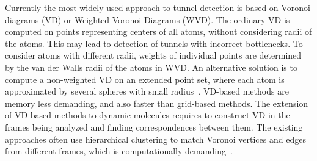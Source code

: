 \documentclass{svmult}
\begin{document}
Currently the most widely used approach to tunnel detection is based on Voronoi diagrams (VD) or Weighted Voronoi Diagrams (WVD).
The ordinary VD is computed on points representing centers of all atoms, without considering radii of the atoms.
This may lead to detection of tunnels with incorrect bottlenecks. %
To consider atoms with different radii, weights of individual points are determined by the van der Walls radii of the atoms in WVD.
An alternative solution is to compute a non-weighted VD on an extended point set, where 
each atom is approximated by several spheres with small radius~\cite{yaffe2008,caver3}.
VD-based methods are memory less demanding, and also faster than grid-based methods.
The extension of VD-based methods to dynamic molecules requires to construct VD in the frames being analyzed and 
finding correspondences between them.
The existing approaches often use hierarchical clustering to match Voronoi vertices and edges from different frames, which is computationally demanding~\cite{lindow2012dynamic,caverDetails}.
\end{document}
